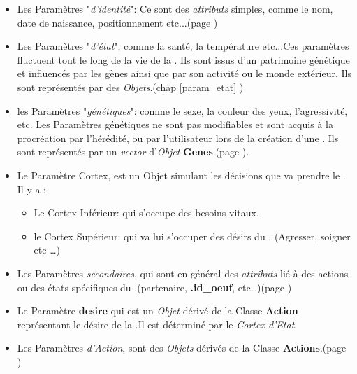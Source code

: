 \documentclass[french]{report}
\newlength{\du}\fi
\begin{document}
\begin{itemize}
\item Les Paramètres "\textit{d'identité}": Ce sont des \textit{attributs} simples, comme le nom, date de naissance, positionnement etc...(page \pageref{identite})\\

\item Les Paramètres "\textit{d'état}", comme la santé, la température etc...Ces paramètres fluctuent tout le long de la vie de la \CoCiX. Ils sont issus d'un patrimoine génétique et influencés par les gènes ainsi que par son activité ou le monde extérieur. Ils sont représentés par des  \textit{Objets}.(chap \ref{param_etat} \pageref{param_etat})\\

\item les Paramètres "\textit{génétiques}": comme le sexe, la couleur des yeux, l'agressivité, etc. Les Paramètres génétiques ne sont pas modifiables et sont acquis à la procréation par l'hérédité, ou par l'utilisateur lors de la création d'une \CoCiX. Ils sont représentés par un \textit{vector} d'\textit{Objet} \textbf{Genes}.(page \pageref{genetique}).\\

\item Le Paramètre Cortex, est un Objet simulant les décisions que va prendre le \CoCiX. Il y a :
\begin{itemize}
	\item Le Cortex Inférieur: qui s'occupe des besoins vitaux.\\
	\item le Cortex Supérieur: qui va lui s'occuper des désirs du \CoCiX. (Agresser, soigner etc \dots)\\
\end{itemize}

\item Les Paramètres \textit{secondaires}, qui sont en général des \textit{attributs} lié à des actions ou des états spécifiques du \CoCiX.(partenaire, \textbf{.id\_oeuf}, etc\dots)(page \pageref{param_second})\\

\item Le Paramètre \textbf{desire} qui est un \textit{Objet} dérivé de la Classe \textbf{Action} représentant le désire de la \CoCiX.Il est déterminé par le \textit{Cortex d'Etat}.\\

\item Les Paramètres \textit{d'Action}, sont des \textit{Objets} dérivés de la Classe \textbf{Actions}.(page \pageref{param_action})\\
\end{itemize}
\end{document}
